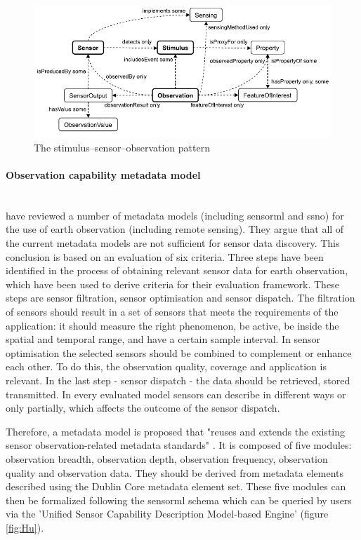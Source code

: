 \begin{figure}
	\centering
	\includegraphics[width=1\linewidth]{figs/sens_stim_obs.png}
	\caption{The stimulus–sensor–observation pattern \cite[p. 28]{SSW:SSN_incubatorGroup}}
	\label{fig:sens-stim-obs}
\end{figure}

\paragraph{Observation capability metadata model} \mbox{}\\
\cite{SW:Hu} have reviewed a number of metadata models (including \ac{sensorml} and \ac{ssno}) for the use of earth observation (including remote sensing). They argue that all of the current metadata models are not sufficient for sensor data discovery. This conclusion is based on an evaluation of six criteria. Three steps have been identified in the process of obtaining relevant sensor data for earth observation, which have been used to derive criteria for their evaluation framework. These steps are sensor filtration, sensor optimisation and sensor dispatch. The filtration of sensors should result in a set of sensors that meets the requirements of the application: it should measure the right phenomenon, be active, be inside the spatial and temporal range, and have a certain sample interval. In sensor optimisation the selected sensors should be combined to complement or enhance each other. To do this, the observation quality, coverage and application is relevant. In the last step - sensor dispatch - the data should be retrieved, stored transmitted. In every evaluated model sensors can describe in different ways or only partially, which affects the outcome of the sensor dispatch. 

Therefore, a metadata model is proposed that "reuses and extends the existing sensor observation-related metadata standards" \cite[p. 10546]{SW:Hu}. It is composed of five modules: observation breadth, observation depth, observation frequency, observation quality and observation data. They should be derived from metadata elements described using the Dublin Core metadata element set. These five modules can then be formalized following the \ac{sensorml} schema which can be queried by users via the 'Unified Sensor Capability Description Model-based Engine' (figure \ref{fig:Hu}). 


